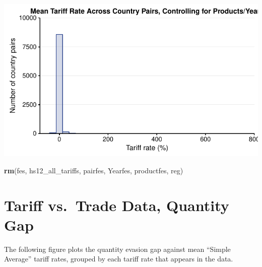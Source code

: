 \documentclass[10pt,]{article}
\newenvironment{Shaded}{\begin{snugshade}}{\end{snugshade}}
\newcommand{\KeywordTok}[1]{\textcolor[rgb]{0.13,0.29,0.53}{\textbf{{#1}}}}
\newcommand{\NormalTok}[1]{{#1}}
\begin{document}
\begin{center}\includegraphics{Figs/tariff_summary-12} \end{center}

\begin{Shaded}
\begin{Highlighting}[]
\KeywordTok{rm}\NormalTok{(fes, hs12_all_tariffs, pairfes, Yearfes, productfes, reg)}
\end{Highlighting}
\end{Shaded}

\section{Tariff vs.~Trade Data, Quantity
Gap}\label{tariff-vs.trade-data-quantity-gap}

The following figure plots the quantity evasion gap against mean
``Simple Average'' tariff rates, grouped by each tariff rate that
appears in the data.
\end{document}
